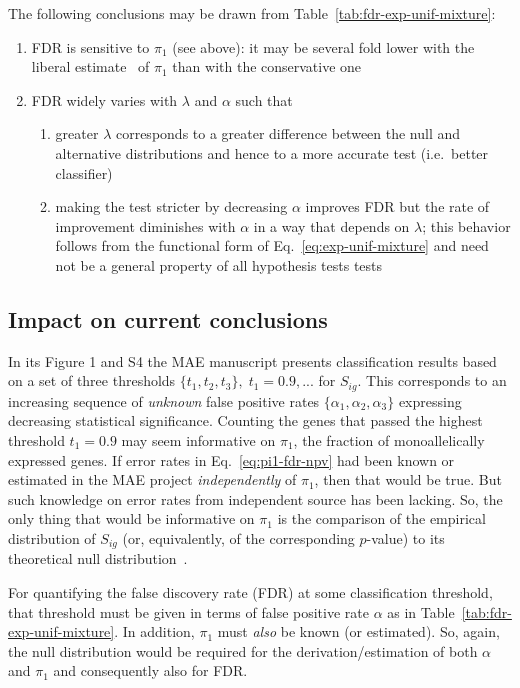 \documentclass[letterpaper]{article}
\begin{document}
The following conclusions may be drawn from
Table~\ref{tab:fdr-exp-unif-mixture}:
\begin{enumerate}
\item FDR is sensitive to \(\pi_1\) (see above): it may be several fold lower with the liberal estimate~\cite{Gregg2010}
of \(\pi_1\) than with the conservative one~\cite{DeVeale2012}
\item FDR widely varies with \(\lambda\) and \(\alpha\) such that
\begin{enumerate}
\item greater \(\lambda\) corresponds to a greater difference between the null
and alternative distributions and hence to a more accurate test (i.e.~better
classifier)
\item making the test stricter by decreasing \(\alpha\) improves FDR but the
rate of improvement diminishes with \(\alpha\) in a way that depends on
\(\lambda\); this behavior follows from the functional form of
Eq.~\ref{eq:exp-unif-mixture} and need not be a general property of
all hypothesis tests tests
\end{enumerate}
\end{enumerate}

\subsection{Impact on current conclusions}

In its Figure 1 and S4 the MAE manuscript presents classification results
based on a set of three thresholds \(\{t_1,t_2,t_3\}, \; t_1=0.9,...\) for
\(S_{ig}\). This corresponds to an increasing sequence of \emph{unknown} false
positive rates \(\{\alpha_1,\alpha_2,\alpha_3\}\) expressing decreasing
statistical significance.  Counting the genes that passed the highest
threshold \(t_1=0.9\) may seem informative on \(\pi_1\), the fraction of
monoallelically expressed genes.  If error rates in Eq.~\ref{eq:pi1-fdr-npv}
had been known or estimated in the MAE project \emph{independently} of
\(\pi_1\), then that would be true.  But such knowledge on error rates from
independent source has been lacking.  So, the only thing that would be
informative on \(\pi_1\) is the comparison of the empirical distribution of
\(S_{ig}\) (or, equivalently, of the corresponding \(p\)-value) to its
theoretical null distribution~\cite{Storey:2003kx}.

For quantifying the false discovery rate (FDR) at some classification
threshold, that threshold must be given in terms of false positive rate
\(\alpha\) as in Table~\ref{tab:fdr-exp-unif-mixture}.  In addition, \(\pi_1\)
must \emph{also} be known (or estimated).  So, again, the null distribution would be
required for the derivation/estimation of both \(\alpha\) and \(\pi_1\) and
consequently also for FDR.
\end{document}
